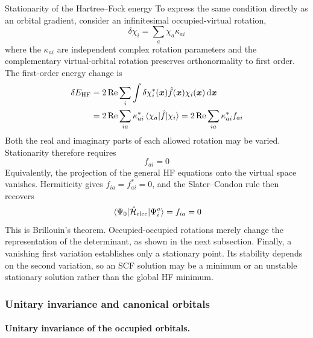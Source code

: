 \documentclass[11pt,a4paper,titlepage]{article}
\numberwithin{equation}{section}
\newcommand{\bx}{\boldsymbol{x}}
\newcommand{\hf}{\Hat{f}}
\newcommand{\chH}{\Hat{\mathcal{H}}}
\begin{document}
\begin{hfsolution}{Stationarity of the Hartree--Fock energy}
To express the same condition directly as an orbital gradient, consider an
infinitesimal occupied-virtual rotation,
\begin{equation}
  \delta\chi_i=\sum_a\chi_a\kappa_{ai}
\end{equation}
where the $\kappa_{ai}$ are independent complex rotation parameters and the
complementary virtual-orbital rotation preserves orthonormality to first
order. The first-order energy change is
\begin{equation}
\begin{split}
  \delta E_\text{HF}
  &=2\Re\sum_i\int\delta\chi_i^*(\bx)
    \hf(\bx)\chi_i(\bx)\dd{\bx}
  \\
  &=2\Re\sum_{ia}\kappa_{ai}^*\mel{\chi_a}{\hf}{\chi_i}
  =2\Re\sum_{ia}\kappa_{ai}^*f_{ai}
\end{split}
\end{equation}
Both the real and imaginary parts of each allowed rotation may be varied.
Stationarity therefore requires
\begin{equation}
  \boxed{f_{ai}=0}
\end{equation}
Equivalently, the projection of the general HF equations onto the virtual
space vanishes. Hermiticity gives $f_{ia}=f_{ai}^*=0$, and the
Slater--Condon rule then recovers
\begin{equation}
  \mel{\Psi_0}{\chH_\text{elec}}{\Psi_i^a}=f_{ia}=0
\end{equation}
This is Brillouin's theorem. Occupied-occupied rotations merely change the
representation of the determinant, as shown in the next subsection.
Finally, a vanishing first variation establishes only a stationary point.
Its stability depends on the second variation, so an SCF solution may be a
minimum or an unstable stationary solution rather than the global HF minimum.

\end{hfsolution}

\subsubsection{Unitary invariance and canonical orbitals}

\hfBioDirac

\paragraph{Unitary invariance of the occupied orbitals.}
\end{document}
